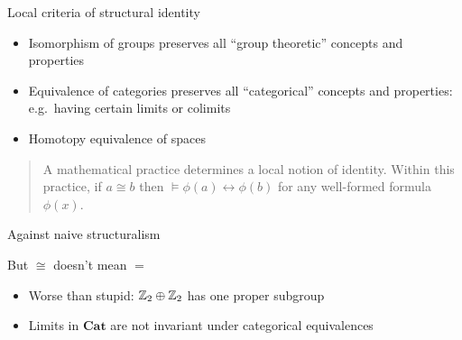 \documentclass[8pt]{beamer}
\begin{document}
\begin{frame}{Local criteria of structural identity}
\begin{itemize}
\item Isomorphism of groups preserves all ``group theoretic'' concepts
  and properties
\item Equivalence of categories preserves all ``categorical'' concepts
  and properties: e.g.\ having certain limits or colimits
\item Homotopy equivalence of spaces
\end{itemize}

\bigskip

\begin{quote} A mathematical practice determines a local notion of
  identity.  Within this practice, if $a\cong b$ then $\models \phi
  (a)\leftrightarrow \phi (b)$ for any well-formed formula $\phi
  (x)$. \end{quote}
\end{frame}


\begin{frame}{Against naive structuralism}

But $\cong$ doesn't mean $=$

\bigskip
  \begin{itemize}
  \item Worse than stupid: $\mathbb Z_2\oplus\mathbb Z_2$ has one proper subgroup

\item Limits in $\mathbf{Cat}$ are not invariant under categorical
  equivalences

\end{itemize}



\end{frame}
\end{document}
